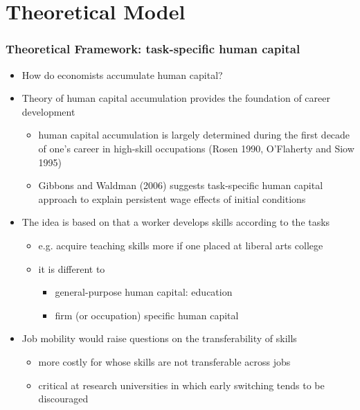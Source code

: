 \documentclass[10pt,svgnames,fragile]{beamer}
\begin{document}
{
	\AtBeginSection{}
\section{Theoretical Model}
\begin{frame}
	\frametitle{Theoretical Framework: task-specific human capital}
	\begin{itemize}
		\item How do economists accumulate human capital?
\vfill
		\item Theory of human capital accumulation provides the foundation of career development
		\begin{itemize}
			\item human capital accumulation is largely determined during the first decade of one's career in high-skill occupations {\small (Rosen 1990, O'Flaherty and Siow 1995)} 
				\vspace{1 mm}
			\item Gibbons and Waldman (2006) suggests task-specific human capital approach to explain persistent wage effects of initial conditions 
		\end{itemize}
\vfill
		\item The idea is based on that a worker develops skills according to the tasks
		\begin{itemize}
			\item e.g. acquire teaching skills more if one placed at liberal arts college
				\vspace{1 mm}
			\item it is different to
			\begin{itemize}
				\item general-purpose human capital: education
					\vspace{1 mm}
				\item firm (or occupation) specific human capital
			\end{itemize}
		\end{itemize}
\vfill
		\item Job mobility would raise  questions on the transferability of skills 
		\begin{itemize}
			\vspace{1 mm}
			\item more costly for  whose skills are not transferable across jobs
			\vspace{1 mm}
			\item critical at research universities in which early switching tends to be discouraged 						
		\end{itemize}
\vfill
	\end{itemize}
\end{frame}



}
\end{document}
